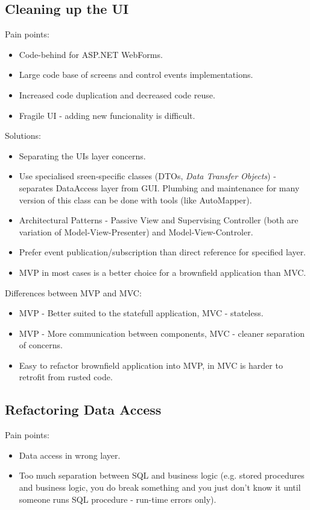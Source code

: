 \documentclass[11pt,a4paper]{article}
\begin{document}
\subsection{Cleaning up the UI}

Pain points:
\begin{itemize}
	\item Code-behind for ASP.NET WebForms.
	\item Large code base of screens and control events implementations.
	\item Increased code duplication and decreased code reuse.
	\item Fragile UI - adding new funcionality is difficult.
\end{itemize}

Solutions:
\begin{itemize}
	\item Separating the UIs layer concerns.
	\item Use specialised sreen-specific classes (DTOs, \textit{Data Transfer Objects}) - separates DataAccess layer from GUI. Plumbing and maintenance for many version of this class can be done with tools (like AutoMapper).
	\item Architectural Patterns - Passive View and Supervising Controller (both are variation of Model-View-Presenter) and Model-View-Controler.
	\item Prefer event publication/subscription than direct reference for specified layer.
	\item MVP in most cases is a better choice for a brownfield application than MVC.
\end{itemize}

Differences between MVP and MVC:
\begin{itemize}
	\item MVP - Better suited to the statefull application, MVC - stateless.
	\item MVP - More communication between components, MVC - cleaner separation of concerns.
	\item Easy to refactor brownfield application into MVP, in MVC is harder to retrofit from rusted code.
\end{itemize}

\subsection{Refactoring Data Access}

Pain points:
\begin{itemize}
	\item Data access in wrong layer.
	\item Too much separation between SQL and business logic (e.g. stored procedures and business logic, you do break something and you just don't know it until someone runs SQL procedure - run-time errors only).
\end{itemize}
\end{document}
